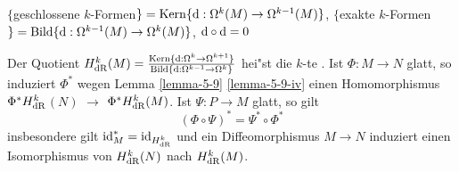 \begin{emptythm}[Erinnerung:]
$\{$geschlossene $k$-Formen$\} = \operatorname{Kern} \{ \mathrm{d}: \Omega^k(M) \to \Omega^{k-1}(M)\}$, $\{$exakte $k$-Formen$\} = \operatorname{Bild}\{ \mathrm{d}: \Omega^{k-1}(M) \to \Omega^k(M)\}$, $\mathrm{d} \circ \mathrm{d} = 0$
\end{emptythm}

Der Quotient $H_{\operatorname{dR}}^k(M) = \frac{\operatorname{Kern}\{\mathrm{d}: \Omega^k \to \Omega^{k+1}\}}{\operatorname{Bild}\{\mathrm{d} : \Omega^{k-1} \to \Omega^k\}}$ hei"st die $k$-te . Ist $\Phi: M \to N$ glatt, so induziert $\Phi^*$ wegen Lemma \ref{lemma-5-9} \ref{lemma-5-9-iv} einen Homomorphismus $\Phi^* H_{\operatorname{dR}}^k$$(N)$ $\to$ $\Phi^* H_{\operatorname{dR}}^k(M)$. Ist $\Psi: P \to M$ glatt, so gilt
	\[ (\Phi \circ \Psi)^* = \Psi^* \circ \Phi^* \]
insbesondere gilt $\operatorname{id}_M^* = \operatorname{id}_{H_{\operatorname{dR}}^k}$ und ein Diffeomorphismus $M \to N$ induziert einen Isomorphismus von $H_{\operatorname{dR}}^k(N)$ nach $H_{\operatorname{dR}}^k(M)$.


